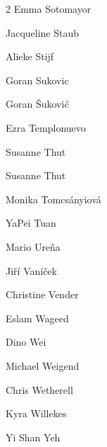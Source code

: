 \begin{multicols}{2}
 \ifdefined\AuthorSotomayorEmma {} Emma Sotomayor\fi
 
 \ifdefined\AuthorStaubJacqueline {} Jacqueline Staub\fi
 
 \ifdefined\AuthorStijfAlieke {} Alieke Stijf\fi
 
 \ifdefined\AuthorSukovicGoran {} Goran Sukovic\fi
 
 \ifdefined\AuthorSukovicGoran {} Goran Šuković\fi
 
 \ifdefined\AuthorTemplonuevoEzra {} Ezra Templonuevo\fi
 
 \ifdefined\AuthorThutSusanne {} Susanne Thut\fi
 
 \ifdefined\AuthorThutSusanne {} Susanne Thut\fi
 
 \ifdefined\AuthorTomcsanyiovaMonika {} Monika Tomcsányiová\fi
 
 \ifdefined\AuthorTuanYaPei {} YaPei Tuan\fi
 
 \ifdefined\AuthorUrenaMario {} Mario Ureña\fi
 
 \ifdefined\AuthorVanicekJiri {} Jiří Vaníček\fi
 
 \ifdefined\AuthorVenderChristine {} Christine Vender\fi
 
 \ifdefined\AuthorWageedEslam {} Eslam Wageed\fi
 
 \ifdefined\AuthorWeiDino {} Dino Wei\fi
 
 \ifdefined\AuthorWeigendMichael {} Michael Weigend\fi
 
 \ifdefined\AuthorWetherellChris {} Chris Wetherell\fi
 
 \ifdefined\AuthorWillekesKyra {} Kyra Willekes\fi
 
 \ifdefined\AuthorYehShanYi {} Yi Shan Yeh\fi

   
\end{multicols}